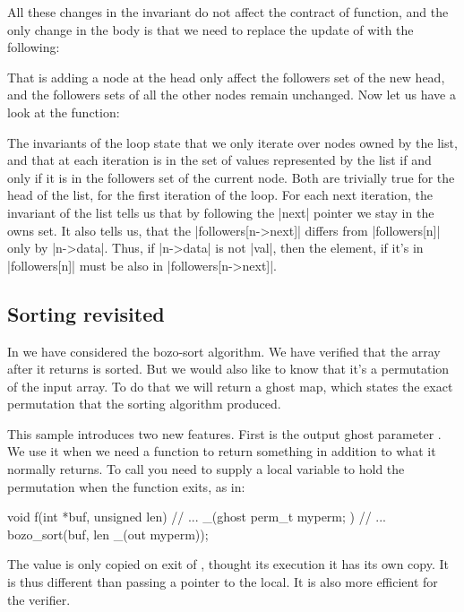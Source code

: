 
\noindent
All these changes in the invariant do not affect
the contract of  function, and the only change in the body
is that we need to replace the update of  with the following:


\noindent
That is adding a node at the head only affect the followers set of the new head,
and the followers sets of all the other nodes remain unchanged.
Now let us have a look at the  function:


\noindent
The invariants of the  loop state that we only iterate over
nodes owned by the list, and that at each iteration  is in the
set of values represented by the list if and only if it is in the followers
set of the current node.
Both are trivially true for the head of the list, for the first iteration
of the loop.
For each next iteration, the invariant of the list tells us that by following
the \vcc|next| pointer we stay in the owns set.
It also tells us, that the \vcc|followers[n->next]| differs
from \vcc|followers[n]| only by \vcc|n->data|.
Thus, if \vcc|n->data| is not \vcc|val|, then the element,
if it's in \vcc|followers[n]| must be also in \vcc|followers[n->next]|.

\subsection{Sorting revisited}
\label{sect:sorting-perm}

In  we have considered the bozo-sort algorithm. 
We have verified that the array after it returns is sorted.
But we would also like to know that it's a permutation of the input array.
To do that we will return a ghost map, which states the exact permutation
that the sorting algorithm produced.


This sample introduces two new features.
First is the output ghost parameter .
We use it when we need a function to return something in addition to what it normally returns.
To call  you need to supply a local variable to hold
the permutation when the function exits, as in:
\begin{VCC}
void f(int *buf, unsigned len)
  // ...
{
  _(ghost perm_t myperm; )
  // ...
  bozo_sort(buf, len _(out myperm));
}
\end{VCC}
The value is only copied on exit of , thought its execution 
it has its own copy.
It is thus different than passing a pointer to the local.
It is also more efficient for the verifier.

